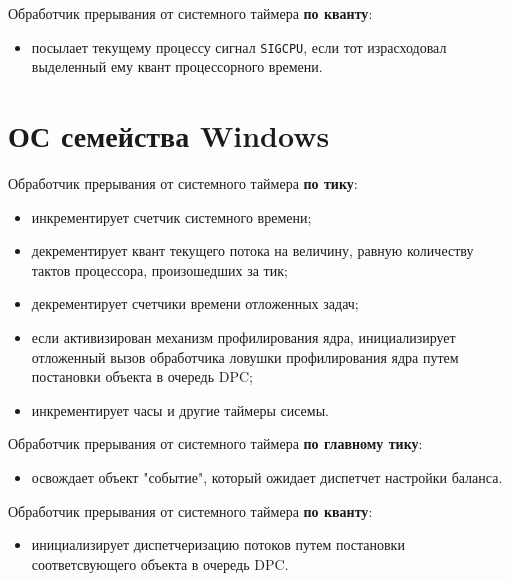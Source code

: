 Обработчик прерывания от системного таймера \textbf{по кванту}:
\begin{itemize}[left=\parindent]
    \item посылает текущему процессу сигнал \texttt{SIGCPU}, если тот
          израсходовал выделенный ему квант процессорного времени. 
\end{itemize}

\section{ОС семейства Windows}

Обработчик прерывания от системного таймера \textbf{по тику}:
\begin{itemize}[left=\parindent]
    \item инкрементирует счетчик системного времени;
    \item декрементирует квант текущего потока на величину, равную количеству
          тактов процессора, произошедших за тик;
    \item декрементирует счетчики времени отложенных задач;
    \item если активизирован механизм профилирования ядра, инициализирует
          отложенный вызов обработчика ловушки профилирования ядра путем
          постановки объекта в очередь DPC;
    \item инкрементирует часы и другие таймеры сисемы.
\end{itemize}

Обработчик прерывания от системного таймера \textbf{по главному тику}:
\begin{itemize}[left=\parindent]
    \item освождает объект "событие", который ожидает диспетчет настройки
          баланса.
\end{itemize}

Обработчик прерывания от системного таймера \textbf{по кванту}:
\begin{itemize}[left=\parindent]
    \item инициализирует диспетчеризацию потоков путем постановки
          соответсвующего объекта в очередь DPC.
\end{itemize}

